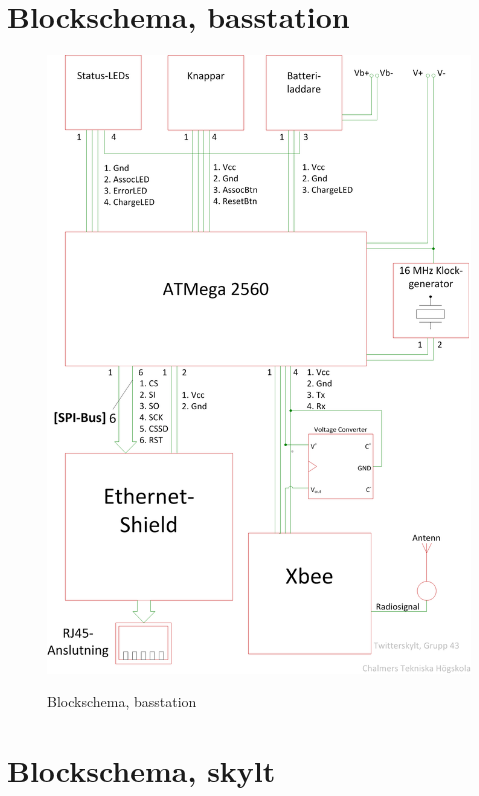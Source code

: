 \documentclass[a4paper,11pt]{article}
\begin{document}
\appendix
\renewcommand{\appendixpagename}{Appendix}
\appendixpage
\renewcommand{\appendixtocname}{Appendix}

\addappheadtotoc

\section{Blockschema, basstation}

\begin{figure}[H]
\includegraphics[scale=0.6, angle=0]{block_bas.png}
\label{fig:block_bas}
\caption{Blockschema, basstation}
\end{figure}
\pagebreak

\section{Blockschema, skylt}
\end{document}
